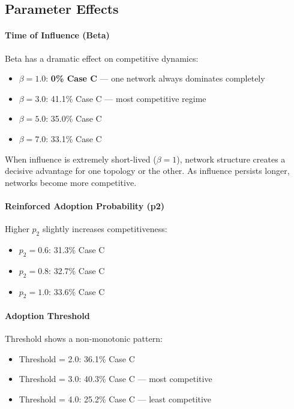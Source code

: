 \documentclass[12pt,a4paper]{article}
\begin{document}
\subsection{Parameter Effects}

\paragraph{Time of Influence (Beta)}

Beta has a dramatic effect on competitive dynamics:
\begin{itemize}
    \item $\beta = 1.0$: \textbf{0\% Case C} --- one network always dominates completely
    \item $\beta = 3.0$: 41.1\% Case C --- most competitive regime
    \item $\beta = 5.0$: 35.0\% Case C
    \item $\beta = 7.0$: 33.1\% Case C
\end{itemize}

When influence is extremely short-lived ($\beta=1$), network structure creates a decisive advantage for one topology or the other. As influence persists longer, networks become more competitive.

\paragraph{Reinforced Adoption Probability (p2)}

Higher $p_2$ slightly increases competitiveness:
\begin{itemize}
    \item $p_2 = 0.6$: 31.3\% Case C
    \item $p_2 = 0.8$: 32.7\% Case C
    \item $p_2 = 1.0$: 33.6\% Case C
\end{itemize}

\paragraph{Adoption Threshold}

Threshold shows a non-monotonic pattern:
\begin{itemize}
    \item Threshold = 2.0: 36.1\% Case C
    \item Threshold = 3.0: 40.3\% Case C --- most competitive
    \item Threshold = 4.0: 25.2\% Case C --- least competitive
\end{itemize}
\end{document}
